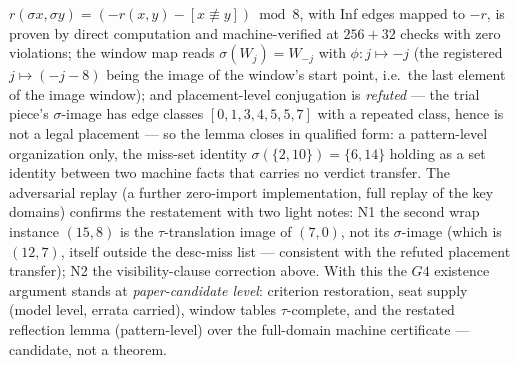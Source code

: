 $r(\sigma x,\sigma y)=(-r(x,y)-[x\not\equiv y])\bmod 8$, with Inf edges
mapped to $-r$, is proven by direct computation and machine-verified at
$256+32$ checks with zero violations; the window map reads
$\sigma(W_j)=W_{-j}$ with $\phi:j\mapsto-j$ (the registered
$j\mapsto(-j-8)$ being the image of the window's start point, i.e.\ the
last element of the image window); and placement-level conjugation is
\emph{refuted} --- the trial piece's $\sigma$-image has edge classes
$[0,1,3,4,5,5,7]$ with a repeated class, hence is not a legal placement ---
so the lemma closes in qualified form: a pattern-level organization only,
the miss-set identity $\sigma(\{2,10\})=\{6,14\}$ holding as a set
identity between two machine facts that carries no verdict transfer. The
adversarial replay (a further zero-import implementation, full replay of
the key domains) confirms the restatement with two light notes:
\textup{N1} the second wrap instance $(15,8)$ is the $\tau$-translation
image of $(7,0)$, not its $\sigma$-image (which is $(12,7)$, itself
outside the desc-miss list --- consistent with the refuted placement
transfer); \textup{N2} the visibility-clause correction above. With this
the $G4$ existence argument stands at \emph{paper-candidate level}:
criterion restoration, seat supply (model level, errata carried), window
tables $\tau$-complete, and the restated reflection lemma (pattern-level)
over the full-domain machine certificate --- candidate, not a theorem.

